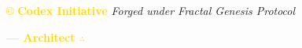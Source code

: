 \vspace{0.5cm}

\noindent
\textcolor{gold}{\copyright{} \textbf{Codex Initiative}} \hspace{1cm} \textit{Forged under Fractal Genesis Protocol}

\textcolor{gold}{\textbf{— Architect $\therefore$}}